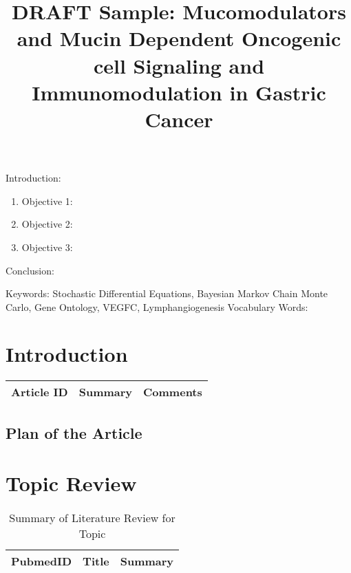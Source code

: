 

\twocolumn
\scriptsize
\begin{frontmatter}
		\title{DRAFT Sample: Mucomodulators and Mucin Dependent Oncogenic cell Signaling and Immunomodulation in Gastric Cancer}
		\author{}
		\address{The Mathematical Learning Space}
\end{frontmatter}	

Introduction:
\begin{enumerate}
\item Objective 1:
\item Objective 2:
\item Objective 3:
\end{enumerate}
Conclusion:

Keywords: Stochastic Differential Equations, Bayesian Markov Chain Monte Carlo, Gene Ontology, VEGFC, Lymphangiogenesis
Vocabulary Words:

\section{Introduction}

\begin{table}[H]\centering
	\begin{tabular}{p{1cm}p{4cm}p{3cm}}
		Article ID & Summary & Comments\\
		\hline
		\hline
	\end{tabular}
\end{table}

\subsection{Plan of the Article}

\begin{enumerate}
\end{enumerate}

\section{Topic Review}

\begin{table}[H]
\centering
\begin{tabular}{r|p{12cm}|l}
\hline
PubmedID  & Title & Summary \\
\hline	
\hline
	\end{tabular}
	\caption{Summary of Literature Review for Topic}
\end{table}	

